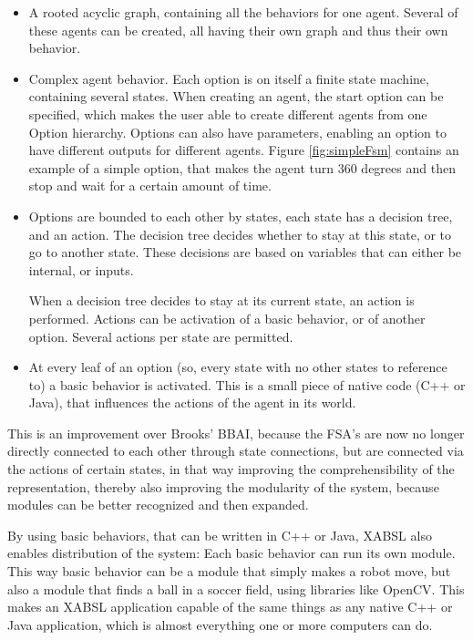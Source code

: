 \documentclass[a4paper,10pt]{article}
\begin{document}
\begin{itemize}
\item {} A rooted acyclic graph, containing all the behaviors for one
agent. Several of these agents can be created, all having their own graph and
thus their own behavior.
\item {} Complex agent behavior. Each option is on itself a finite
state machine, containing several states. When creating an agent, the start
option can be specified, which makes the user able to create different agents
from one Option hierarchy. Options can also have parameters, enabling an option
to have different outputs for different agents. Figure \ref{fig:simpleFsm}
contains an example of a simple option, that makes the agent turn 360 degrees
and then stop and wait for a certain amount of time.
\item {} Options are bounded to each other by states, each state has
a decision tree, and an action. The decision tree decides whether to stay at
this state, or to go to another state. These decisions are based on variables
that can either be internal, or inputs.

When a decision tree decides to stay at its current state, an action is
performed. Actions can be activation of a basic behavior, or of another option.
Several actions per state are permitted.
\item {} At every leaf of an option (so, every state with no
other states to reference to) a basic behavior is activated. This is a small
piece of native code (C++ or Java), that influences the actions of the agent
in its world. 
\end{itemize}

This is an improvement over Brooks' BBAI, because the FSA's are now no
longer directly connected to each other through state connections, but are
connected via the actions of
certain states, in that way improving the comprehensibility of the
representation, thereby also improving the modularity of the system, because
modules can be better recognized and then expanded.

By using basic behaviors, that can be written in C++ or Java, XABSL also
enables distribution of the system: Each basic behavior can run its own module.
This way basic behavior can be a module that simply makes a robot move, but also a
module that finds a ball in a soccer field, using libraries like OpenCV. This
makes an XABSL application capable of the same things as any native C++ or Java
application, which is almost everything one or more computers can do.
\end{document}
